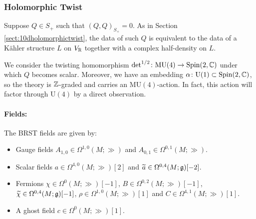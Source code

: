 \documentclass[10pt, oneside]{article}
\newcommand{\MU}{\mathrm{MU}}
\renewcommand{\U}{\mathrm{U}}
\begin{document}
\subsubsection{Holomorphic Twist}
\label{sect:8dholomorphictwist}

Suppose $Q\in S_+$ such that $(Q, Q)_{S_+}=0$. As in Section \ref{sect:10dholomorphictwist}, the data of such $Q$ is equivalent to the data of a K\"ahler structure $L$ on $V_\mathbb R$ together with a complex half-density on $L$.

We consider the twisting homomorphism $\det^{1/2}\colon \MU(4)\rightarrow \Spin(2, \CC)$ under which $Q$ becomes scalar. Moreover, we have an embedding $\alpha\colon \U(1)\subset\Spin(2, \CC)$, so the theory is $\mathbb Z$-graded and carries an $\MU(4)$-action. In fact, this action will factor through $\U(4)$ by a direct observation.

\vspace{-10pt}
\paragraph{Fields:} The BRST fields are given by:
\begin{itemize}
\item Gauge fields $A_{1, 0}\in\Omega^{1, 0}(M; \gg)$ and $A_{0, 1}\in\Omega^{0, 1}(M; \gg)$.
\item Scalar fields $a\in\Omega^{4,0}(M; \gg)[2]$ and $\widetilde{a}\in\Omega^{0, 4}(M; \mathfrak{g})[-2]$.
\item Fermions $\chi\in\Omega^0(M; \gg)[-1]$, $B\in\Omega^{0, 2}(M; \gg)[-1]$, $\widetilde{\chi}\in\Omega^{0, 4}(M; \mathfrak{g})[-1]$, $\rho\in\Omega^{1, 0}(M; \gg)[1]$ and $C\in\Omega^{4, 1}(M; \gg)[1]$.
\item A ghost field $c\in \Omega^0(M; \gg)[1]$.
\end{itemize}
\end{document}
